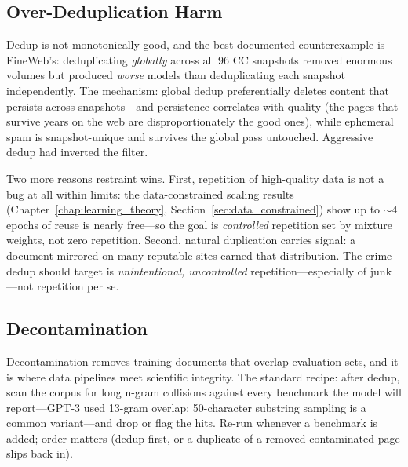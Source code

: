 \subsection{Over-Deduplication Harm}

Dedup is not monotonically good, and the best-documented counterexample is FineWeb's: deduplicating \textit{globally} across all 96 CC snapshots removed enormous volumes but produced \textit{worse} models than deduplicating each snapshot independently. The mechanism: global dedup preferentially deletes content that persists across snapshots---and persistence correlates with quality (the pages that survive years on the web are disproportionately the good ones), while ephemeral spam is snapshot-unique and survives the global pass untouched. Aggressive dedup had inverted the filter.

Two more reasons restraint wins. First, repetition of high-quality data is not a bug at all within limits: the data-constrained scaling results (Chapter~\ref{chap:learning_theory}, Section~\ref{sec:data_constrained}) show up to $\sim$4 epochs of reuse is nearly free---so the goal is \textit{controlled} repetition set by mixture weights, not zero repetition. Second, natural duplication carries signal: a document mirrored on many reputable sites earned that distribution. The crime dedup should target is \textit{unintentional, uncontrolled} repetition---especially of junk---not repetition per se.

\subsection{Decontamination}

Decontamination removes training documents that overlap evaluation sets, and it is where data pipelines meet scientific integrity. The standard recipe: after dedup, scan the corpus for long n-gram collisions against every benchmark the model will report---GPT-3 used 13-gram overlap; 50-character substring sampling is a common variant---and drop or flag the hits. Re-run whenever a benchmark is added; order matters (dedup first, or a duplicate of a removed contaminated page slips back in).

